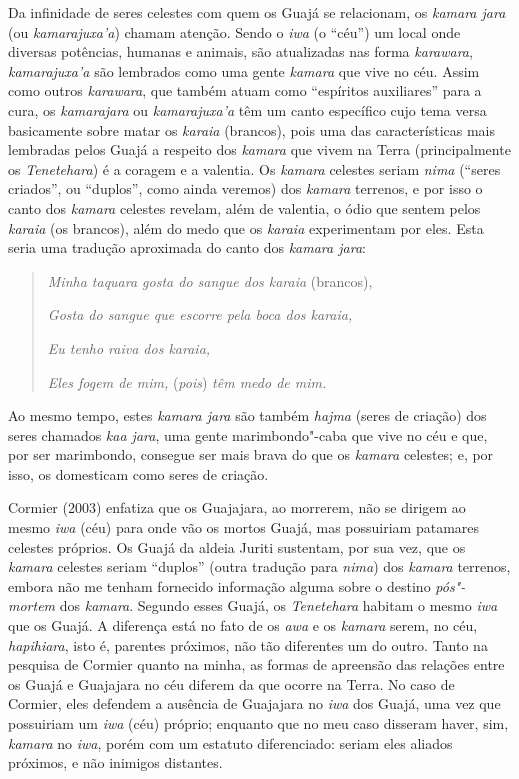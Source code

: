 Da infinidade de seres celestes com quem os Guajá se relacionam, os
\emph{kamara jara} (ou \emph{kamarajuxa'a}) chamam atenção. Sendo o
\emph{iwa} (o ``céu'') um local onde diversas potências, humanas e
animais, são atualizadas nas forma \emph{karawara}, \emph{kamarajuxa'a}
são lembrados como uma gente \emph{kamara} que vive no céu. Assim como
outros \emph{karawara}, que também atuam como ``espíritos auxiliares''
para a cura, os \emph{kamarajara} ou \emph{kamarajuxa'a} têm um canto
específico cujo tema versa basicamente sobre matar os \emph{karaia}
(brancos), pois uma das características mais lembradas pelos Guajá a
respeito dos \emph{kamara} que vivem na Terra (principalmente os
\emph{Tenetehara}) é a coragem e a valentia. Os \emph{kamara} celestes
seriam \emph{nima} (``seres criados'', ou ``duplos'', como ainda veremos)
dos \emph{kamara} terrenos, e por isso o canto dos \emph{kamara}
celestes revelam, além de valentia, o ódio que sentem pelos
\emph{karaia} (os brancos), além do medo que os \emph{karaia}
experimentam por eles. Esta seria uma tradução aproximada do canto dos
\emph{kamara jara}:

\begin{quote}
\emph{Minha taquara gosta do sangue dos karaia} (brancos),

\noindent\emph{Gosta do sangue que escorre pela boca dos karaia,}

\noindent\emph{Eu tenho raiva dos karaia,}

\noindent\emph{Eles fogem de mim,} (\emph{pois}) \emph{têm medo de mim.}
\end{quote}

Ao mesmo tempo, estes \emph{kamara jara} são também \emph{hajma} (seres
de criação) dos seres chamados \emph{kaa jara}, uma gente
marimbondo"-caba que vive no céu e que, por ser marimbondo, consegue ser
mais brava do que os \emph{kamara} celestes; e, por isso, os domesticam
como seres de criação.

Cormier (2003) enfatiza que os Guajajara, ao morrerem, não se dirigem ao
mesmo \emph{iwa} (céu) para onde vão os mortos Guajá, mas possuiriam
patamares celestes próprios. Os Guajá da aldeia Juriti sustentam, por
sua vez, que os \emph{kamara} celestes seriam ``duplos'' (outra tradução
para \emph{nima}) dos \emph{kamara} terrenos, embora não me tenham
fornecido informação alguma sobre o destino \emph{pós"-mortem} dos
\emph{kamara}. Segundo esses Guajá, os \emph{Tenetehara} habitam o mesmo
\emph{iwa} que os Guajá. A diferença está no fato de os \emph{awa} e os
\emph{kamara} serem, no céu, \emph{hapihiara}, isto é, parentes
próximos, não tão diferentes um do outro. Tanto na pesquisa de Cormier
quanto na minha, as formas de apreensão das relações entre os Guajá e
Guajajara no céu diferem da que ocorre na Terra. No caso de Cormier,
eles defendem a ausência de Guajajara no \emph{iwa} dos Guajá, uma vez
que possuiriam um \emph{iwa} (céu) próprio; enquanto que no meu caso
disseram haver, sim, \emph{kamara} no \emph{iwa}, porém com um estatuto
diferenciado: seriam eles aliados próximos, e não inimigos distantes.

